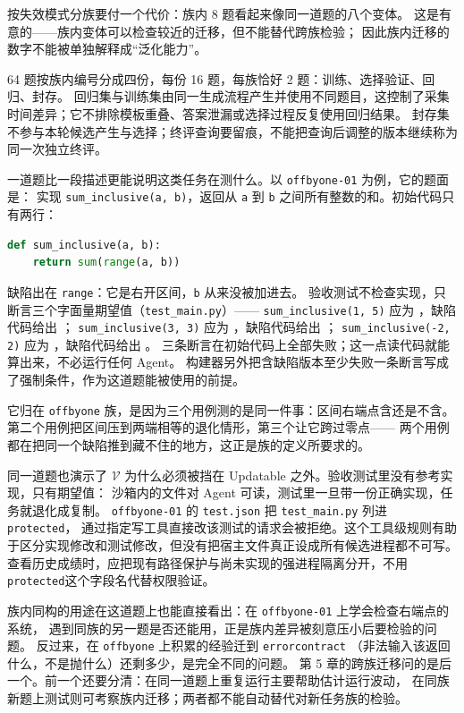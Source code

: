 按失效模式分族要付一个代价：族内 8 题看起来像同一道题的八个变体。
这是有意的——族内变体可以检查较近的迁移，但不能替代跨族检验；
因此族内迁移的数字不能被单独解释成“泛化能力”。

64 题按族内编号分成四份，每份 16 题，每族恰好 2 题：训练、选择验证、回归、封存。
回归集与训练集由同一生成流程产生并使用不同题目，这控制了采集时间差异；它不排除模板重叠、答案泄漏或选择过程反复使用回归结果。
封存集不参与本轮候选产生与选择；终评查询要留痕，不能把查询后调整的版本继续称为同一次独立终评。

一道题比一段描述更能说明这类任务在测什么。以 \texttt{offbyone-01} 为例，它的题面是：
实现 \texttt{sum\_inclusive(a, b)}，返回从 \texttt{a} 到 \texttt{b} 之间所有整数的和。初始代码只有两行：

\begin{lstlisting}[language=Python]
def sum_inclusive(a, b):
    return sum(range(a, b))
\end{lstlisting}

缺陷出在 \texttt{range}：它是右开区间，\texttt{b} 从来没被加进去。
验收测试不检查实现，只断言三个字面量期望值（\texttt{test\_main.py}）——
\texttt{sum\_inclusive(1, 5)} 应为 ，缺陷代码给出 ；
\texttt{sum\_inclusive(3, 3)} 应为 ，缺陷代码给出 ；
\texttt{sum\_inclusive(-2, 2)} 应为 ，缺陷代码给出 。
三条断言在初始代码上全部失败；这一点读代码就能算出来，不必运行任何 Agent。
构建器另外把含缺陷版本至少失败一条断言写成了强制条件，作为这道题能被使用的前提。

它归在 \texttt{offbyone} 族，是因为三个用例测的是同一件事：区间右端点含还是不含。
第二个用例把区间压到两端相等的退化情形，第三个让它跨过零点——
两个用例都在把同一个缺陷推到藏不住的地方，这正是族的定义所要求的。

同一道题也演示了 $\mathcal V$ 为什么必须被挡在 Updatable 之外。验收测试里没有参考实现，只有期望值：
沙箱内的文件对 Agent 可读，测试里一旦带一份正确实现，任务就退化成复制。
\texttt{offbyone-01} 的 \texttt{test.json} 把 \texttt{test\_main.py} 列进 \texttt{protected}，
通过指定写工具直接改该测试的请求会被拒绝。这个工具级规则有助于区分实现修改和测试修改，但没有把宿主文件真正设成所有候选进程都不可写。查看历史成绩时，应把现有路径保护与尚未实现的强进程隔离分开，不用\texttt{protected}这个字段名代替权限验证。

族内同构的用途在这道题上也能直接看出：在 \texttt{offbyone-01} 上学会检查右端点的系统，
遇到同族的另一题是否还能用，正是族内差异被刻意压小后要检验的问题。
反过来，在 \texttt{offbyone} 上积累的经验迁到 \texttt{errorcontract}
（非法输入该返回什么，不是抛什么）还剩多少，是完全不同的问题。
第 5 章的跨族迁移问的是后一个。前一个还要分清：在同一道题上重复运行主要帮助估计运行波动，
在同族新题上测试则可考察族内迁移；两者都不能自动替代对新任务族的检验。

